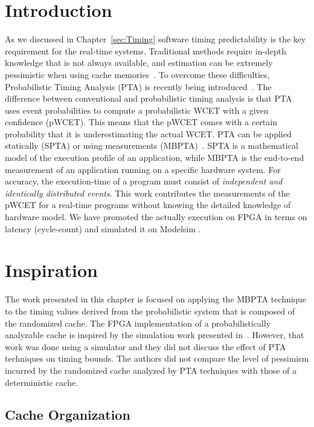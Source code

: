 \section{Introduction}
As we discussed in Chapter~\ref{sec:Timing} software timing predictability is the key requirement for the real-time systems. Traditional methods require
in-depth knowledge that is not always available, and estimation can be
extremely pessimistic when using cache
memories~\cite{Wilhelm:2008:WEP:1347375.1347389}.  To overcome these
difficulties, Probabilistic Timing Analysis (PTA) is recently being
introduced~\cite{Cazorla:2013:PPA:2465787.2465796}.  The difference
between conventional and probabilistic timing analysis is that PTA
uses event probabilities to compute a probabilistic WCET with a given
confidence (pWCET). This means that the pWCET comes with a certain
probability that it is underestimating the actual WCET.  PTA can be
applied statically (SPTA) or using measurements
(MBPTA)~\cite{Cazorla:2013:PPA:2465787.2465796}. SPTA is a
mathematical model of the execution profile of an application, while
MBPTA is the end-to-end measurement of an application running on a
specific hardware system. For accuracy, the execution-time of a
program must consist of \textit{independent and identically distributed
events}. This work contributes the measurements of the pWCET for a real-time programs
without knowing the detailed knowledge of hardware model. We have
promoted the actually execution on FPGA in terms on latency (cycle-count) and
simulated it on Modelsim \cite{mrtc:modelsim}.

\section{Inspiration}
The work presented in this chapter is focused on applying the MBPTA technique to the timing values derived from the probabilistic system that is composed of the randomized cache. The FPGA implementation of a probabilistically analyzable
cache is inspired by the simulation work presented
in~\cite{Kosmidis:2013:CDP:2485288.2485416}. However, that work was done using a simulator and they did not discuss the effect of PTA techniques on timing bounds. The authors did not compare the level of pessimism incurred by the randomized cache analyzed by PTA techniques with those of a deterministic cache.




\subsection{Cache Organization}


